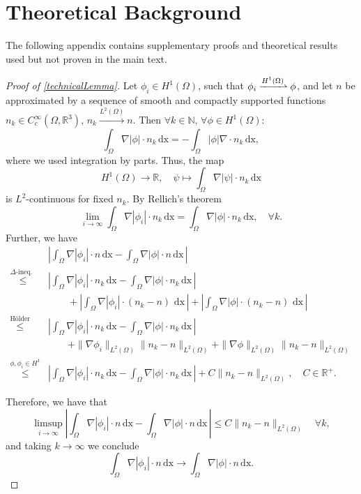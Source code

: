 \documentclass[draft,12pt,openany]{book}
\newcommand{\R}{\mathbb{R}}
\theoremstyle{plainnormal}
\theoremstyle{remark}
\begin{document}
\chapter{Theoretical Background}
The following appendix contains supplementary proofs and theoretical results used but not proven in the main text.
\begin{proof}[Proof of \cref{technicalLemma}]
    Let $\phi_i\in H^1(\Omega)$, such that $\phi_i\xrightharpoonup{H^1(\Omega)} \phi$, and let $n$ be approximated by a sequence of smooth and compactly supported functions $n_k\in C_c^\infty(\Omega, \R^3)$, $n_k \xrightarrow{L^2(\Omega)} n$. Then $ \forall k\in \mathbb N, \, \forall \phi \in H^1(\Omega):$
    $$\int_\Omega \nabla |\phi|\cdot n_k \,\mathrm{dx} = - \int_\Omega |\phi| \nabla \cdot n_k \,\mathrm{dx},$$
    where we used integration by parts. Thus, the map $$
    H^1(\Omega) \rightarrow\R,\quad
        \psi \mapsto \int_\Omega \nabla |\psi|\cdot n_k \,\mathrm{dx}
     $$ 
    is $L^2$-continuous for fixed $n_k$. By Rellich's theorem $$\lim_{i\rightarrow\infty}\int_\Omega \nabla |\phi_i|\cdot n_k \,\mathrm{dx} = \int_\Omega \nabla |\phi|\cdot n_k \,\mathrm{dx}, \quad \forall k.$$ Further, we have
    \begin{align*}
        &\left|\int_\Omega \nabla |\phi_i|\cdot n \,\mathrm{dx} - \int_\Omega \nabla |\phi|\cdot n \,\mathrm{dx}\,\right|\\
       \overset{\Delta\text{-ineq.        }\,}{\leq} &\left|\int_\Omega \nabla |\phi_i|\cdot n_k \,\mathrm{dx} - \int_\Omega \nabla |\phi|\cdot n_k \,\mathrm{dx}\,\right| \\&\quad \quad + \left| \int_\Omega \nabla |\phi_i| \cdot (n_k - n) \, \,\mathrm{dx}\, \right| 
 + \left| \int_\Omega \nabla |\phi| \cdot (n_k - n) \, \,\mathrm{dx}\, \right|\\
       \overset{\text{Hölder}}{\leq} &\left|\int_\Omega \nabla |\phi_i|\cdot n_k \,\mathrm{dx} - \int_\Omega \nabla |\phi|\cdot n_k \,\mathrm{dx}\,\right| \\ &\quad \quad+ \|\nabla \phi_i\|_{L^2(\Omega)} \|n_k - n\|_{L^2(\Omega)}  + \|\nabla \phi\|_{L^2(\Omega)} \|n_k - n\|_{L^2(\Omega)}\\
       \overset{\phi, \phi_i \in H^1 }{\leq} &\left|\int_\Omega \nabla |\phi_i|\cdot n_k \,\mathrm{dx} - \int_\Omega \nabla |\phi|\cdot n_k \,\mathrm{dx}\,\right| + C\|n_k - n\|_{L^2(\Omega)},\quad C\in \R^+.
    \end{align*}
    
    Therefore, we have that $$\limsup_{i\rightarrow\infty} \left| \int_\Omega \nabla |\phi_i|\cdot n \,\mathrm{dx} - \int_\Omega \nabla |\phi|\cdot n \,\mathrm{dx}\,\right| \leq C\|n_k - n\|_{L^2(\Omega)}\quad \forall k,$$ and taking $k\rightarrow\infty$ we conclude $$\int_\Omega \nabla |\phi_i|\cdot n \,\mathrm{dx} \rightarrow\int_\Omega \nabla |\phi|\cdot n \,\mathrm{dx}.$$
\end{proof}
\end{document}
